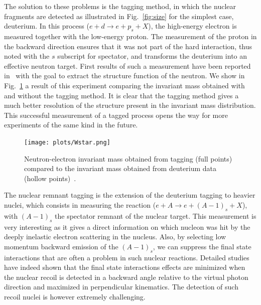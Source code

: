 The solution to these problems is the tagging method, in which the nuclear fragments
are detected as illustrated in Fig.~\ref{fig:size} for the simplest case, deuterium.
In this process ($e+d \rightarrow e+p_s+X$), the high-energy electron is measured
together with the low-energy proton. The measurement of the proton in the backward 
direction ensures that it was not part of the hard interaction, thus noted with 
the $s$ subscript for spectator, and transforms the deuterium into 
an effective neutron target. First results of such a measurement
have been reported in~\cite{Baillie:2011za} with the goal to extract the structure
function of the neutron. We show in Fig.~\ref{fig:wstar} a result of this experiment
comparing the invariant mass obtained with and without the tagging method. It is 
clear that the tagging method gives a much better resolution of the structure 
present in the invariant mass distribution. This successful measurement of a tagged process opens the way for more
experiments of the same kind in the future. 

\begin{figure}[htbp!]
\texttt{[image: plots/Wstar.png]}
\caption{Neutron-electron invariant mass obtained from tagging (full points) compared 
to the invariant mass obtained
from deuterium data (hollow points)~\cite{Baillie:2011za}.}
\label{fig:wstar}
\end{figure}

The nuclear remnant tagging is the extension of the deuterium tagging to heavier nuclei, which
consists in measuring the reaction ($e+A \rightarrow e+(A-1)_s+X$), with
$(A-1)_s$ the spectator remnant of the nuclear target. This measurement is very 
interesting as it gives a direct information on which nucleon was hit by the 
deeply inelastic electron scattering in the nucleus. Also, by selecting 
low momentum backward emission of the $(A-1)_s$, we can suppress the 
final state interactions that are often a problem in such nuclear reactions. 
Detailed studies~\cite{CiofidegliAtti:2003pb,Alvioli:2006jd} have indeed shown 
that the final state interactions effects are minimized when the nuclear recoil
is detected in a backward angle relative to 
the virtual photon direction and maximized in perpendicular kinematics.
The detection of such recoil nuclei is however extremely challenging.

